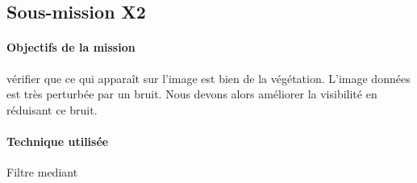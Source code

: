 \subsection{Sous-mission X2}

	\begin{vwcol}[widths={0.65,0.2}, rule=0pt]
	\begin{minipage}{0.7\textwidth}
	\paragraph{Objectifs de la mission}

	vérifier que ce qui apparaît sur l'image est bien de la végétation. L'image données est très perturbée par un bruit. Nous devons alors améliorer la visibilité en réduisant ce bruit.
	\end{minipage}

	\begin{minipage}{0.25\textwidth}
	\begin{flushright}
	\paragraph{Technique utilisée}
	
	Filtre mediant\up{\ref{Mediant}}
	\end{flushright}
	\end{minipage}

	\end{vwcol} 

